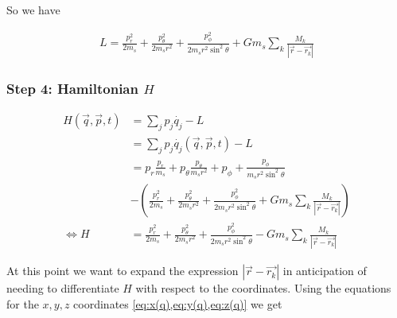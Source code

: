 So we have

\begin{align}
    L = \frac{p_r^2}{2 m_s} + \frac{p_\theta^2}{2 m_s r^2} + \frac{p_\phi^2}{2 m_s r^2 \sin^2{\theta}} + G m_s \sum\limits_{k} \frac{M_k}{\left| \vec{r} - \vec{r_k} \right|}
\end{align}

\subsubsection{Step 4: Hamiltonian \(H\)}
\begin{align}
    H(\vec{q}, \vec{p}, t) &= \sum\limits_{j}p_j \dot{q_j} - L \\
    &= \sum\limits_{j}p_j \dot{q_j}(\vec{q}, \vec{p}, t) - L \\
    &= p_r \frac{p_r}{m_s} + p_\theta \frac{p_\theta}{m_s r^2} + p_\phi + \frac{p_\phi}{m_s r^2 \sin^2{\theta}} \nonumber \\
    &- \left( \frac{p_r^2}{2 m_s} + \frac{p_\theta^2}{2 m_s r^2} + \frac{p_\phi^2}{2 m_s r^2 \sin^2{\theta}} + G m_s \sum\limits_{k} \frac{M_k}{\left| \vec{r} - \vec{r_k} \right|} \right) \\
    \Leftrightarrow H &= \frac{p_r^2}{2 m_s} + \frac{p_\theta^2}{2 m_s r^2} + \frac{p_\phi^2}{2 m_s r^2 \sin^2{\theta}} - G m_s \sum\limits_{k} \frac{M_k}{\left| \vec{r} - \vec{r_k} \right|}
\end{align}

At this point we want to expand the expression \(\left| \vec{r} - \vec{r_k} \right|\) in anticipation of needing to differentiate \(H\) with respect to the coordinates. Using the equations for the \(x, y, z\) coordinates \cref{eq:x(q),eq:y(q),eq:z(q)} we get

